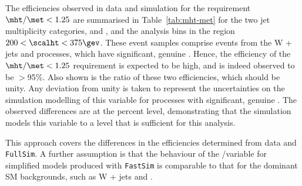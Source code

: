 The efficiencies observed in data and simulation for the requirement
$\mht/\met < 1.25$ are summarised in Table~\ref{tab:mht-met} for the
two jet multiplicity categories, \njetlow and \njethigh, and the
analysis \scalht bins in the region $200 < \scalht < 375\gev$. These
event samples comprise events from the W + jets and \ttbar processes,
which have significant, genuine \met. Hence, the efficiency of the
$\mht/\met < 1.25$ requirement is expected to be high, and is indeed
observed to be $>$95\%. Also shown is the ratio of these two
efficiencies, which should be unity. Any deviation from unity is taken
to represent the uncertainties on the simulation modelling of this
variable for processes with significant, genuine \met. The observed
differences are at the percent level, demonstrating that the
simulation models this variable to a level that is sufficient for this
analysis.

This approach covers the differences in the efficiencies determined
from data and \verb!FullSim!. A further assumption is that the
behaviour of the \mht/\met variable for simplified models produced
with \verb!FastSim! is comparable to that for the dominant SM
backgrounds, such as W + jets and \ttbar.

